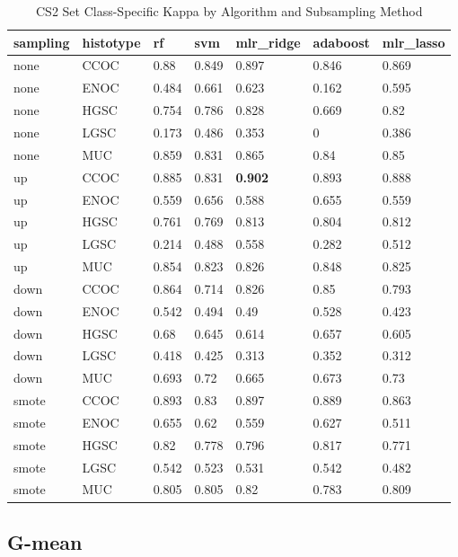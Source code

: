\documentclass[
]{report}
\begin{document}
\begin{table}

\caption{\label{tab:cs2-kappa-class-table}CS2 Set Class-Specific Kappa by Algorithm and Subsampling Method}
\centering
\begin{tabular}[t]{l|l|l|l|l|l|l}
\hline
sampling & histotype & rf & svm & mlr\_ridge & adaboost & mlr\_lasso\\
\hline
none & CCOC & 0.88 & 0.849 & 0.897 & 0.846 & 0.869\\
\hline
none & ENOC & 0.484 & 0.661 & 0.623 & 0.162 & 0.595\\
\hline
none & HGSC & 0.754 & 0.786 & 0.828 & 0.669 & 0.82\\
\hline
none & LGSC & 0.173 & 0.486 & 0.353 & 0 & 0.386\\
\hline
none & MUC & 0.859 & 0.831 & 0.865 & 0.84 & 0.85\\
\hline
up & CCOC & 0.885 & 0.831 & \textbf{0.902} & 0.893 & 0.888\\
\hline
up & ENOC & 0.559 & 0.656 & 0.588 & 0.655 & 0.559\\
\hline
up & HGSC & 0.761 & 0.769 & 0.813 & 0.804 & 0.812\\
\hline
up & LGSC & 0.214 & 0.488 & 0.558 & 0.282 & 0.512\\
\hline
up & MUC & 0.854 & 0.823 & 0.826 & 0.848 & 0.825\\
\hline
down & CCOC & 0.864 & 0.714 & 0.826 & 0.85 & 0.793\\
\hline
down & ENOC & 0.542 & 0.494 & 0.49 & 0.528 & 0.423\\
\hline
down & HGSC & 0.68 & 0.645 & 0.614 & 0.657 & 0.605\\
\hline
down & LGSC & 0.418 & 0.425 & 0.313 & 0.352 & 0.312\\
\hline
down & MUC & 0.693 & 0.72 & 0.665 & 0.673 & 0.73\\
\hline
smote & CCOC & 0.893 & 0.83 & 0.897 & 0.889 & 0.863\\
\hline
smote & ENOC & 0.655 & 0.62 & 0.559 & 0.627 & 0.511\\
\hline
smote & HGSC & 0.82 & 0.778 & 0.796 & 0.817 & 0.771\\
\hline
smote & LGSC & 0.542 & 0.523 & 0.531 & 0.542 & 0.482\\
\hline
smote & MUC & 0.805 & 0.805 & 0.82 & 0.783 & 0.809\\
\hline
\end{tabular}
\end{table}

\hypertarget{g-mean-3}{%
\subsection{G-mean}\label{g-mean-3}}
\end{document}
